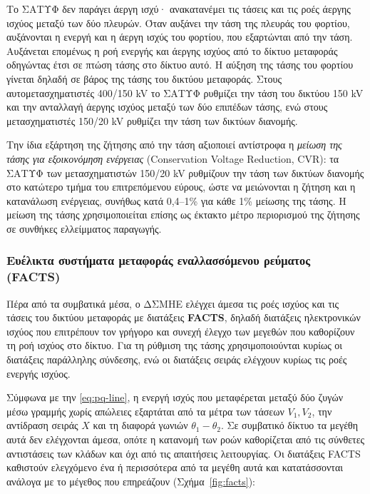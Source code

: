 Το ΣΑΤΥΦ δεν παράγει άεργη ισχύ· ανακατανέμει τις τάσεις και τις ροές άεργης ισχύος
μεταξύ των δύο πλευρών. Όταν αυξάνει την τάση της πλευράς του φορτίου, αυξάνονται η ενεργή και
η άεργη ισχύς του φορτίου, που εξαρτώνται από την τάση. Αυξάνεται επομένως η ροή ενεργής και άεργης ισχύος από το δίκτυο μεταφοράς οδηγώντας έτσι σε πτώση τάσης στο δίκτυο αυτό. Η αύξηση της τάσης του φορτίου γίνεται δηλαδή
σε βάρος της τάσης του δικτύου μεταφοράς. Στους αυτομετασχηματιστές 400/150 kV το ΣΑΤΥΦ ρυθμίζει την τάση
του δικτύου 150 kV και την ανταλλαγή άεργης ισχύος μεταξύ των δύο επιπέδων τάσης, ενώ στους
μετασχηματιστές 150/20 kV ρυθμίζει την τάση των δικτύων διανομής.

Την ίδια εξάρτηση της ζήτησης από την τάση αξιοποιεί αντίστροφα η \emph{μείωση της τάσης για
εξοικονόμηση ενέργειας} (Conservation Voltage Reduction, CVR): τα ΣΑΤΥΦ των μετασχηματιστών
150/20 kV ρυθμίζουν την τάση των δικτύων διανομής στο κατώτερο τμήμα του επιτρεπόμενου εύρους,
ώστε να μειώνονται η ζήτηση και η κατανάλωση ενέργειας, συνήθως κατά 0,4--1\% για κάθε 1\%
μείωσης της τάσης. Η μείωση της τάσης χρησιμοποιείται επίσης ως έκτακτο μέτρο
περιορισμού της ζήτησης σε συνθήκες ελλείμματος παραγωγής.

\subsubsection{Ευέλικτα συστήματα μεταφοράς εναλλασσόμενου ρεύματος (FACTS)}
\label{sec:facts}

Πέρα από τα συμβατικά μέσα, ο ΔΣΜΗΕ ελέγχει άμεσα τις ροές ισχύος και τις τάσεις του δικτύου
μεταφοράς με διατάξεις \textbf{FACTS}, δηλαδή διατάξεις ηλεκτρονικών ισχύος που επιτρέπουν τον
γρήγορο και συνεχή έλεγχο των μεγεθών που καθορίζουν τη ροή ισχύος στο δίκτυο. Για τη ρύθμιση της τάσης χρησιμοποιούνται κυρίως οι διατάξεις παράλληλης σύνδεσης,
ενώ οι διατάξεις σειράς ελέγχουν κυρίως τις ροές ενεργής ισχύος.

Σύμφωνα με την \eqref{eq:pq-line}, η ενεργή ισχύς που μεταφέρεται μεταξύ δύο ζυγών μέσω
γραμμής χωρίς απώλειες εξαρτάται από τα μέτρα των τάσεων $V_1, V_2$, την αντίδραση σειράς
$X$ και τη διαφορά γωνιών $\theta_1 - \theta_2$. Σε
συμβατικό δίκτυο τα μεγέθη αυτά δεν ελέγχονται άμεσα, οπότε η κατανομή των ροών καθορίζεται
από τις σύνθετες αντιστάσεις των κλάδων και όχι από τις απαιτήσεις λειτουργίας. Οι διατάξεις
FACTS καθιστούν ελεγχόμενο ένα ή περισσότερα από τα μεγέθη αυτά και κατατάσσονται ανάλογα με
το μέγεθος που επηρεάζουν (Σχήμα~\ref{fig:facts}):

